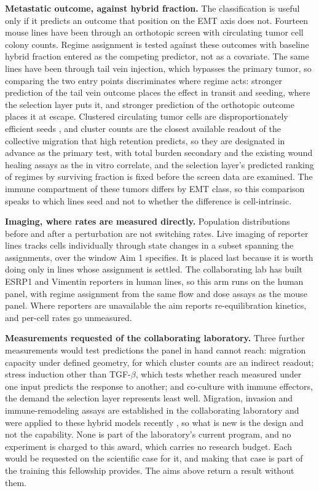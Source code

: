\documentclass[12pt,letterpaper]{article}
\newcommand{\chg}[1]{\textcolor{chgcolor}{#1}}
\newcommand{\chg}[1]{#1}
\newcommand{\lead}[1]{\textbf{#1}}
\begin{document}
\lead{Metastatic outcome, against hybrid fraction.} The classification is useful only if it predicts an outcome that position on the EMT axis does not. Fourteen mouse lines have been through an orthotopic screen with circulating tumor cell colony counts. Regime assignment is tested against these outcomes with baseline hybrid fraction entered as the competing predictor, not as a covariate. The same lines have been through tail vein injection, which bypasses the primary tumor, so comparing the two entry points discriminates where regime acts: stronger prediction of the tail vein outcome places the effect in transit and seeding, where the selection layer puts it, and stronger prediction of the orthotopic outcome places it at escape. Clustered circulating tumor cells are disproportionately efficient seeds \cite{aceto2014}, and cluster counts are the closest available readout of the collective migration that high retention predicts, so they are designated in advance as the primary test, with total burden secondary and the existing wound healing assays as the in vitro correlate, and the selection layer's predicted ranking of regimes by surviving fraction is fixed before the screen data are examined. \chg{The immune compartment of these tumors differs by EMT class, so this comparison speaks to which lines seed and not to whether the difference is cell-intrinsic.}

\lead{Imaging, where rates are measured directly.} Population distributions before and after a perturbation are not switching rates. Live imaging of reporter lines tracks cells individually through state changes in a subset spanning the assignments, over the window Aim 1 specifies. It is placed last because it is worth doing only in lines whose assignment is settled. The collaborating lab has built ESRP1 and Vimentin reporters in human lines, so this arm runs on the human panel, with regime assignment from the same flow and dose assays as the mouse panel. Where reporters are unavailable the aim reports re-equilibration kinetics, and per-cell rates go unmeasured.

\chg{\lead{Measurements requested of the collaborating laboratory.} Three further measurements would test predictions the panel in hand cannot reach: migration capacity under defined geometry, for which cluster counts are an indirect readout; stress induction other than TGF-$\beta$, which tests whether reach measured under one input predicts the response to another; and co-culture with immune effectors, the demand the selection layer represents least well. Migration, invasion and immune-remodeling assays are established in the collaborating laboratory and were applied to these hybrid models recently \cite{visal2025}, so what is new is the design and not the capability. None is part of the laboratory's current program, and no experiment is charged to this award, which carries no research budget. Each would be requested on the scientific case for it, and making that case is part of the training this fellowship provides. The aims above return a result without them.}
\end{document}
